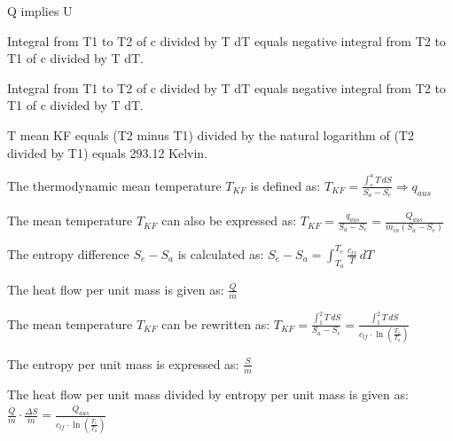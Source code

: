 Q implies U  

Integral from T1 to T2 of c divided by T dT equals negative integral from T2 to T1 of c divided by T dT.  

Integral from T1 to T2 of c divided by T dT equals negative integral from T2 to T1 of c divided by T dT.  

T mean KF equals (T2 minus T1) divided by the natural logarithm of (T2 divided by T1) equals 293.12 Kelvin.

The thermodynamic mean temperature \( T_{KF} \) is defined as:  
\( T_{KF} = \frac{\int_{e}^{a} T \, dS}{S_a - S_e} \Rightarrow q_{aus} \)  

The mean temperature \( T_{KF} \) can also be expressed as:  
\( T_{KF} = \frac{\dot{q}_{aus}}{S_a - S_e} = \frac{\dot{Q}_{aus}}{\dot{m}_{in} (S_a - S_e)} \)  

The entropy difference \( S_e - S_a \) is calculated as:  
\( S_e - S_a = \int_{T_a}^{T_e} \frac{c_{lf}}{T} \, dT \)  

The heat flow per unit mass is given as:  
\( \frac{\dot{Q}}{\dot{m}} \)  

The mean temperature \( T_{KF} \) can be rewritten as:  
\( T_{KF} = \frac{\int_{1}^{2} T \, dS}{S_a - S_e} = \frac{\int_{1}^{2} T \, dS}{c_{lf} \cdot \ln \left( \frac{T_e}{T_a} \right)} \)  

The entropy per unit mass is expressed as:  
\( \frac{S}{\dot{m}} \)  

The heat flow per unit mass divided by entropy per unit mass is given as:  
\( \frac{\dot{Q}}{\dot{m}} \cdot \frac{\Delta S}{\dot{m}} = \frac{\dot{Q}_{aus}}{c_{lf} \cdot \ln \left( \frac{T_e}{T_a} \right)} \)